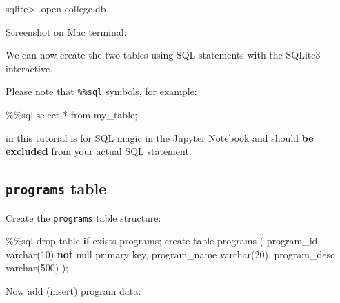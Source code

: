 \documentclass[
  letterpaper,
]{scrbook}
\newenvironment{Shaded}{\begin{snugshade}}{\end{snugshade}}
\newcommand{\ControlFlowTok}[1]{\textcolor[rgb]{0.00,0.23,0.31}{\textbf{#1}}}
\newcommand{\DecValTok}[1]{\textcolor[rgb]{0.68,0.00,0.00}{#1}}
\newcommand{\ImportTok}[1]{\textcolor[rgb]{0.00,0.46,0.62}{#1}}
\newcommand{\KeywordTok}[1]{\textcolor[rgb]{0.00,0.23,0.31}{\textbf{#1}}}
\newcommand{\NormalTok}[1]{\textcolor[rgb]{0.00,0.23,0.31}{#1}}
\newcommand{\OperatorTok}[1]{\textcolor[rgb]{0.37,0.37,0.37}{#1}}
\begin{document}
\begin{Shaded}
\begin{Highlighting}[]
\NormalTok{sqlite\textgreater{} .open college.db}
\end{Highlighting}
\end{Shaded}

Screenshot on Mac terminal:

We can now create the two tables using SQL statements with the SQLite3
interactive.

Please note that \texttt{\%\%sql} symbols, for example:

\begin{Shaded}
\begin{Highlighting}[]
\OperatorTok{\%\%}\NormalTok{sql}
\NormalTok{select }\OperatorTok{*} \ImportTok{from}\NormalTok{ my\_table}\OperatorTok{;}
\end{Highlighting}
\end{Shaded}

in this tutorial is for SQL magic in the Jupyter Notebook and should
\textbf{be excluded} from your actual SQL statement.

\subsection*{\texorpdfstring{\texttt{programs}
table}{programs table}}\label{programs-table}

Create the \texttt{programs} table structure:

\begin{Shaded}
\begin{Highlighting}[]
\OperatorTok{\%\%}\NormalTok{sql}
\NormalTok{drop table }\ControlFlowTok{if}\NormalTok{ exists programs}\OperatorTok{;}
\NormalTok{create table programs (}
\NormalTok{    program\_id varchar(}\DecValTok{10}\NormalTok{) }\KeywordTok{not}\NormalTok{ null primary key, }
\NormalTok{    program\_name varchar(}\DecValTok{20}\NormalTok{), }
\NormalTok{    program\_desc varchar(}\DecValTok{500}\NormalTok{)}
\NormalTok{)}\OperatorTok{;}
\end{Highlighting}
\end{Shaded}

Now add (insert) program data:
\end{document}

